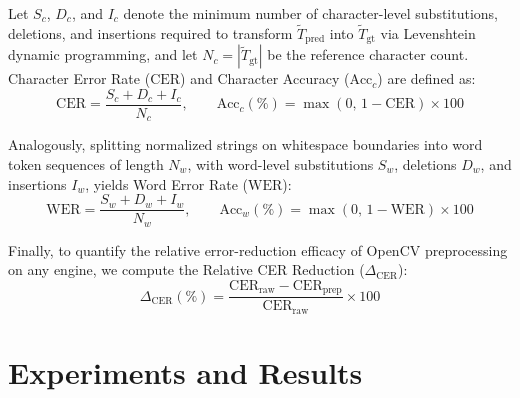 \documentclass[11pt,a4paper]{article}
\begin{document}
Let $S_c$, $D_c$, and $I_c$ denote the minimum number of character-level substitutions, deletions, and insertions required to transform $\tilde{T}_{\text{pred}}$ into $\tilde{T}_{\text{gt}}$ via Levenshtein dynamic programming, and let $N_c = |\tilde{T}_{\text{gt}}|$ be the reference character count. Character Error Rate ($\text{CER}$) and Character Accuracy ($\text{Acc}_c$) are defined as:
\begin{equation}
    \text{CER} = \frac{S_c + D_c + I_c}{N_c}, \qquad \text{Acc}_c (\%) = \max\!\left(0,\, 1 - \text{CER}\right) \times 100
\end{equation}

Analogously, splitting normalized strings on whitespace boundaries into word token sequences of length $N_w$, with word-level substitutions $S_w$, deletions $D_w$, and insertions $I_w$, yields Word Error Rate ($\text{WER}$):
\begin{equation}
    \text{WER} = \frac{S_w + D_w + I_w}{N_w}, \qquad \text{Acc}_w (\%) = \max\!\left(0,\, 1 - \text{WER}\right) \times 100
\end{equation}

Finally, to quantify the relative error-reduction efficacy of OpenCV preprocessing on any engine, we compute the Relative CER Reduction ($\Delta_{\text{CER}}$):
\begin{equation}
    \Delta_{\text{CER}} (\%) = \frac{\text{CER}_{\text{raw}} - \text{CER}_{\text{prep}}}{\text{CER}_{\text{raw}}} \times 100
\end{equation}

\newpage
\section{Experiments and Results}
\end{document}
